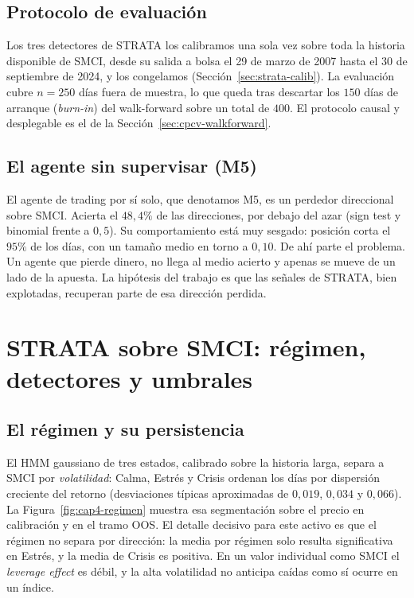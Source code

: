 \subsection{Protocolo de evaluación}
\label{sec:smci-protocolo}

Los tres detectores de STRATA los calibramos una sola vez sobre toda la historia disponible de SMCI, desde su salida a bolsa el 29 de marzo de 2007 hasta el 30 de septiembre de 2024, y los congelamos (Sección~\ref{sec:strata-calib}). La evaluación cubre $n = 250$ días fuera de muestra, lo que queda tras descartar los $150$ días de arranque (\emph{burn-in}) del walk-forward sobre un total de $400$. El protocolo causal y desplegable es el de la Sección~\ref{sec:cpcv-walkforward}.

\subsection{El agente sin supervisar (M5)}
\label{sec:smci-m5}

El agente de trading por sí solo, que denotamos M5, es un perdedor direccional sobre SMCI. Acierta el $48{,}4\%$ de las direcciones, por debajo del azar (sign test y binomial frente a $0{,}5$). Su comportamiento está muy sesgado: posición corta el $95\%$ de los días, con un tamaño medio en torno a $0{,}10$. De ahí parte el problema. Un agente que pierde dinero, no llega al medio acierto y apenas se mueve de un lado de la apuesta. La hipótesis del trabajo es que las señales de STRATA, bien explotadas, recuperan parte de esa dirección perdida.

\section{STRATA sobre SMCI: régimen, detectores y umbrales}
\label{sec:smci-strata}

\subsection{El régimen y su persistencia}
\label{sec:smci-regimen}

El HMM gaussiano de tres estados, calibrado sobre la historia larga, separa a SMCI por \emph{volatilidad}: Calma, Estrés y Crisis ordenan los días por dispersión creciente del retorno (desviaciones típicas aproximadas de $0{,}019$, $0{,}034$ y $0{,}066$). La Figura~\ref{fig:cap4-regimen} muestra esa segmentación sobre el precio en calibración y en el tramo OOS. El detalle decisivo para este activo es que el régimen no separa por dirección: la media por régimen solo resulta significativa en Estrés, y la media de Crisis es positiva. En un valor individual como SMCI el \emph{leverage effect} es débil, y la alta volatilidad no anticipa caídas como sí ocurre en un índice.

